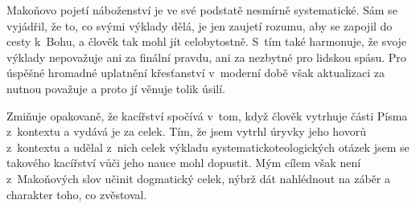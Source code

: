 Makoňovo pojetí náboženství je ve své podstatě nesmírně systematické. Sám se
vyjádřil, že to, co svými výklady dělá, je jen zaujetí rozumu, aby se zapojil do
cesty k~Bohu, a člověk tak mohl jít celobytostně. S~tím také harmonuje, že svoje
výklady nepovažuje ani za finální pravdu, ani za nezbytné pro lidskou spásu. Pro
úspěšné hromadné uplatnění křesťanství v~moderní době však aktualizaci za nutnou
považuje a proto jí věnuje tolik úsilí.

Zmiňuje opakovaně, že kacířství spočívá v~tom, když člověk vytrhuje části Písma
z~kontextu a vydává je za celek. Tím, že jsem vytrhl úryvky jeho hovorů
z~kontextu a udělal z~nich celek výkladu systematicko\-teologických otázek jsem
se takového kacířství vůči jeho nauce mohl dopustit. Mým cílem však není
z~Makoňových slov učinit dogmatický celek, nýbrž dát nahlédnout na záběr a
charakter toho, co zvěstoval.
